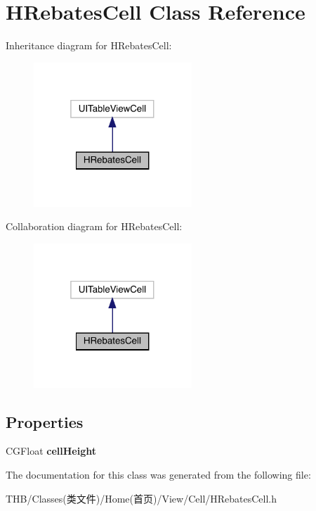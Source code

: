 \hypertarget{interface_h_rebates_cell}{}\section{H\+Rebates\+Cell Class Reference}
\label{interface_h_rebates_cell}


Inheritance diagram for H\+Rebates\+Cell\+:\nopagebreak
\begin{figure}[H]
\begin{center}
\leavevmode
\includegraphics[width=169pt]{interface_h_rebates_cell__inherit__graph}
\end{center}
\end{figure}


Collaboration diagram for H\+Rebates\+Cell\+:\nopagebreak
\begin{figure}[H]
\begin{center}
\leavevmode
\includegraphics[width=169pt]{interface_h_rebates_cell__coll__graph}
\end{center}
\end{figure}
\subsection*{Properties}
\begin{DoxyCompactItemize}
\item 
\mbox{\label{interface_h_rebates_cell_a492d951516140d49a4f4b657cdf9a3d9}} 
C\+G\+Float {\bfseries cell\+Height}
\end{DoxyCompactItemize}


The documentation for this class was generated from the following file\+:\begin{DoxyCompactItemize}
\item 
T\+H\+B/\+Classes(类文件)/\+Home(首页)/\+View/\+Cell/H\+Rebates\+Cell.\+h\end{DoxyCompactItemize}
